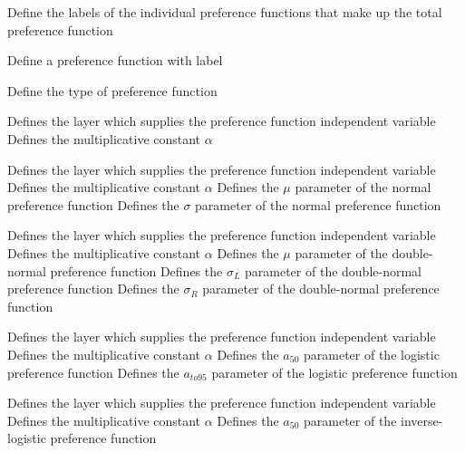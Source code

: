  {Define the labels of the individual  preference functions that make up the total preference function}
\par{} {Define a preference function with label}\par
{} {Define the type of preference function}
\par\textbf{}\par
{} {Defines the layer which supplies the preference function independent variable}
 {Defines the multiplicative constant $\alpha$}
\par\textbf{}\par
{} {Defines the layer which supplies the preference function independent variable}
 {Defines the multiplicative constant $\alpha$}
 {Defines the $\mu$ parameter of the normal preference function}
 {Defines the $\sigma$ parameter of the normal preference function}
\par\textbf{}\par
{} {Defines the layer which supplies the preference function independent variable}
 {Defines the multiplicative constant $\alpha$}
 {Defines the $\mu$ parameter of the double-normal preference function}
 {Defines the $\sigma_L$ parameter of the double-normal preference function}
 {Defines the $\sigma_R$ parameter of the double-normal preference function}
\par\textbf{}\par
{} {Defines the layer which supplies the preference function independent variable}
 {Defines the multiplicative constant $\alpha$}
 {Defines the $a_{50}$ parameter of the logistic preference function}
 {Defines the $a_{to95}$ parameter of the logistic preference function}
\par\textbf{}\par
{} {Defines the layer which supplies the preference function independent variable}
 {Defines the multiplicative constant $\alpha$}
 {Defines the $a_{50}$ parameter of the inverse-logistic preference function}

